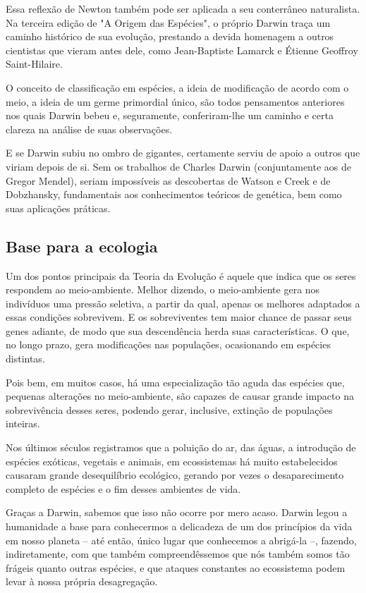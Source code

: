 \documentclass[12pt]{extarticle}
\begin{document}
Essa reflexão de Newton também pode ser aplicada a seu conterrâneo
naturalista. Na terceira edição de "A Origem das Espécies", o próprio
Darwin traça um caminho histórico de sua evolução, prestando a devida
homenagem a outros cientistas que vieram antes dele, como Jean-Baptiste
Lamarck e Étienne Geoffroy Saint-Hilaire.

O conceito de classificação em espécies, a ideia de modificação de
acordo com o meio, a ideia de um germe primordial único, são todos
pensamentos anteriores nos quais Darwin bebeu e, seguramente,
conferiram-lhe um caminho e certa clareza na análise de suas
observações.

E se Darwin subiu no ombro de gigantes, certamente serviu de apoio a
outros que viriam depois de si. Sem os trabalhos de Charles Darwin
(conjuntamente aos de Gregor Mendel), seriam impossíveis as descobertas
de Watson e Creek e de Dobzhansky, fundamentais aos conhecimentos
teóricos de genética, bem como suas aplicações práticas.

\subsection{Base para a ecologia}

Um dos pontos principais da Teoria da Evolução é aquele que indica que
os seres respondem ao meio-ambiente. Melhor dizendo, o meio-ambiente
gera nos indivíduos uma pressão seletiva, a partir da qual, apenas os
melhores adaptados a essas condições sobrevivem. E os sobreviventes tem
maior chance de passar seus genes adiante, de modo que sua descendência
herda suas características. O que, no longo prazo, gera modificações nas
populações, ocasionando em espécies distintas.

Pois bem, em muitos casos, há uma especialização tão aguda das espécies
que, pequenas alterações no meio-ambiente, são capazes de causar grande
impacto na sobrevivência desses seres, podendo gerar, inclusive,
extinção de populações inteiras.

Nos últimos séculos registramos que a poluição do ar, das águas, a
introdução de espécies exóticas, vegetais e animais, em ecossistemas há
muito estabelecidos causaram grande desequilíbrio ecológico, gerando por
vezes o desaparecimento completo de espécies e o fim desses ambientes de
vida.

Graças a Darwin, sabemos que isso não ocorre por mero acaso. Darwin
legou a humanidade a base para conhecermos a delicadeza de um dos
princípios da vida em nosso planeta -- até então, único lugar que
conhecemos a abrigá-la --, fazendo, indiretamente, com que também
compreendêssemos que nós também somos tão frágeis quanto outras
espécies, e que ataques constantes ao ecossistema podem levar à nossa
própria desagregação.
\end{document}
